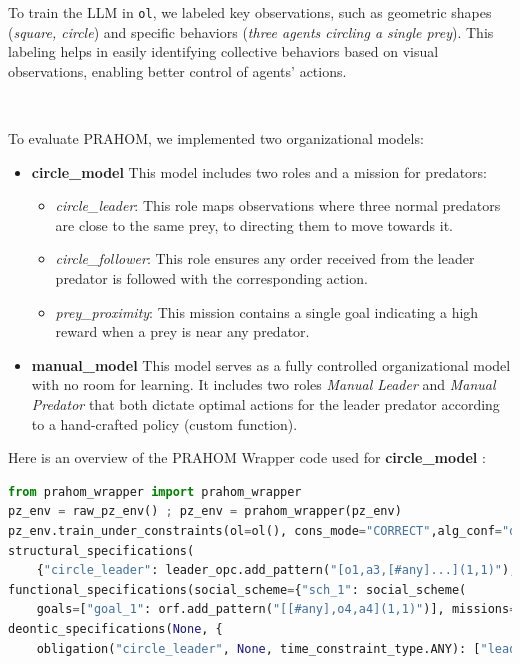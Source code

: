 \documentclass[runningheads]{llncs}
\theoremstyle{freethm}
\theoremstyle{proofoutline}
\begin{document}
\noindent To train the LLM in \texttt{ol}, we labeled key observations, such as geometric shapes (\textit{square, circle}) and specific behaviors (\textit{three agents circling a single prey}). This labeling helps in easily identifying collective behaviors based on visual observations, enabling better control of agents' actions.

\

\noindent To evaluate PRAHOM, we implemented two organizational models:

\begin{itemize}
    \item \textbf{circle\_model} \quad This model includes two roles and a mission for predators:
          \begin{itemize}
              \item \textit{circle\_leader}: This role maps observations where three normal predators are close to the same prey, to directing them to move towards it.
              \item \textit{circle\_follower}: This role ensures any order received from the leader predator is followed with the corresponding action.
              \item \textit{prey\_proximity}: This mission contains a single goal indicating a high reward when a prey is near any predator.
          \end{itemize}

    \item \textbf{manual\_model} \quad This model serves as a fully controlled organizational model with no room for learning. It includes two roles \textit{Manual Leader} and \textit{Manual Predator} that both dictate optimal actions for the leader predator according to a hand-crafted policy (custom function).
\end{itemize}

\noindent Here is an overview of the PRAHOM Wrapper code used for \textbf{circle\_model} :
%
\begin{lstlisting}[language=Python, basicstyle=\scriptsize]
from prahom_wrapper import prahom_wrapper
pz_env = raw_pz_env() ; pz_env = prahom_wrapper(pz_env)
pz_env.train_under_constraints(ol=ol(), cons_mode="CORRECT",alg_conf="default_MAPPO",osr=organizational_model(
structural_specifications(
    {"circle_leader": leader_opc.add_pattern("[o1,a3,[#any]...](1,1)"),"circle_follower": normal_opc.add_pattern("[o1,a2,[#any]...](1,1)")}, None,None),
functional_specifications(social_scheme={"sch_1": social_scheme(
    goals=["goal_1": orf.add_pattern("[[#any],o4,a4](1,1)")], missions=["prey_proximity"], goals_structure=None, mission_to_goals={"prey_proximity": ["goal_0"]}, mission_to_agent_cardinality={"prey_proximity": cardinality(1, "*")})}, social_preferences=None),
deontic_specifications(None, {
    obligation("circle_leader", None, time_constraint_type.ANY): ["leadadversary_0"], obligation("circle_follower", None, time_constraint_type.ANY): ["adversary_0", "adversary_1", "adversary_2"]})))
\end{lstlisting}
\end{document}
